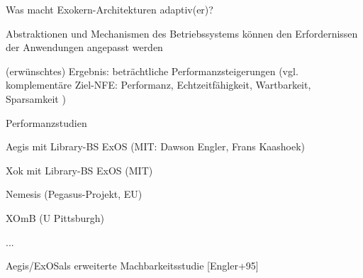 \documentclass[a4paper]{article}
\begin{document}
\begin{multicols}{3}
    \begin{itemize*}
        \item Was macht Exokern-Architekturen adaptiv(er)?
        \begin{itemize*}
            \item Abstraktionen und Mechanismen des Betriebssystems können den Erfordernissen der Anwendungen angepasst werden
            \item (erwünschtes) Ergebnis: beträchtliche Performanzsteigerungen (vgl. komplementäre Ziel-NFE: Performanz, Echtzeitfähigkeit, Wartbarkeit, Sparsamkeit )
        \end{itemize*}
    \end{itemize*}

    Performanzstudien

    \begin{enumerate*}
        \item Aegis mit Library-BS ExOS (MIT: Dawson Engler, Frans Kaashoek)
        \item Xok mit Library-BS ExOS (MIT)
        \item Nemesis (Pegasus-Projekt, EU)
        \item XOmB (U Pittsburgh)
        \item ...
    \end{enumerate*}

    Aegis/ExOSals erweiterte Machbarkeitsstudie [Engler+95]


\end{multicols}
\end{document}

